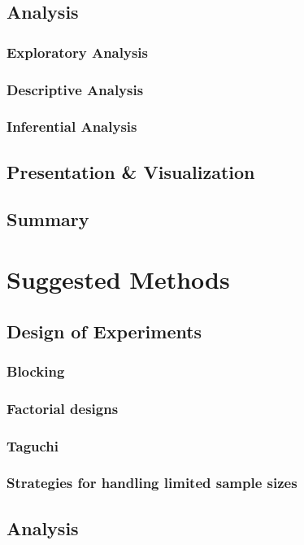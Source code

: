 \documentclass[11pt,a4paper,article]{memoir} %
\begin{document}
\section{Analysis}
\subsection{Exploratory Analysis}
\subsection{Descriptive Analysis}
\subsection{Inferential Analysis}

\section{Presentation \& Visualization}

\section{Summary}

\newpage


\chapter{Suggested Methods}
\section{Design of Experiments}
\subsection{Blocking}
\subsection{Factorial designs}
\subsection{Taguchi}
\subsection{Strategies for handling limited sample sizes}

\section{Analysis}
\end{document}
